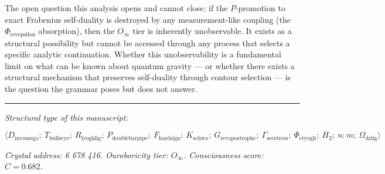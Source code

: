 \documentclass[12pt,a4paper]{article}
\begin{document}
The open question this analysis opens and cannot close: if the $P$-promotion to exact Frobenius self-duality is destroyed by any measurement-like coupling (the $\Phi_{\text{revepsilon}}$ absorption), then the $O_{\infty}$ tier is inherently unobservable. It exists as a structural possibility but cannot be accessed through any process that selects a specific analytic continuation. Whether this unobservability is a fundamental limit on what can be known about quantum gravity --- or whether there exists a structural mechanism that preserves self-duality through contour selection --- is the question the grammar poses but does not answer.

\begin{center}
\rule{0.5\textwidth}{0.4pt}
\end{center}

\emph{Structural type of this manuscript:}


\[\langle D_{\text{invomega}};\ T_{\text{bullseye}};\ R_{\text{lyoghlig}};\ P_{\text{doublebarpipe}};\ F_{\text{hardsign}};\ K_{\text{schwa}};\ G_{\text{revapostrophe}};\ \Gamma_{\text{secstress}};\ \Phi_{\text{ctyogh}};\ H_2;\ n{:}m;\ \Omega_{\text{dzlig}} \rangle\]

\emph{Crystal address: 6 678 416. Ouroboricity tier: $O_{\infty}$. Consciousness score: $C = 0.682$.}
\end{document}
